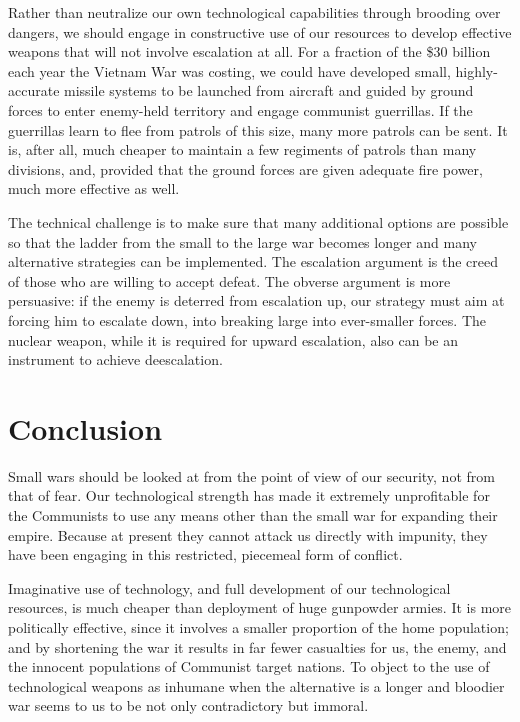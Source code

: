 Rather than neutralize our own technological capabilities through brooding over dangers, we should engage in constructive use of our resources to develop effective weapons that will not involve escalation at all. For a fraction of the \$30 billion each year the Vietnam War was costing, we could have developed small, highly-accurate missile systems to be launched from aircraft and guided by ground forces to enter enemy-held territory and engage communist guerrillas. If the guerrillas learn to flee from patrols of this size, many more patrols can be sent. It is, after all, much cheaper to maintain a few regiments of patrols than many divisions, and, provided that the ground forces are given adequate fire power, much more effective as well.

The technical challenge is to make sure that many additional options are possible so that the ladder from the small to the large war becomes longer and many alternative strategies can be implemented. The escalation argument is the creed of those who are willing to accept defeat. The obverse argument is more persuasive: if the enemy is deterred from escalation up, our strategy must aim at forcing him to escalate down, into breaking large into ever-smaller forces. The nuclear weapon, while it is required for upward escalation, also can be an instrument to achieve deescalation.

\section{Conclusion}
Small wars should be looked at from the point of view of our security, not from that of fear. Our technological strength has made it extremely unprofitable for the Communists to use any means other than the small war for expanding their empire. Because at present they cannot attack us directly with impunity, they have been engaging in this restricted, piecemeal form of conflict.

Imaginative use of technology, and full development of our technological resources, is much cheaper than deployment of huge gunpowder armies. It is more politically effective, since it involves a smaller proportion of the home population; and by shortening the war it results in far fewer casualties for us, the enemy, and the innocent populations of Communist target nations. To object to the use of technological weapons as inhumane when the alternative is a longer and bloodier war seems to us to be not only contradictory but immoral.

